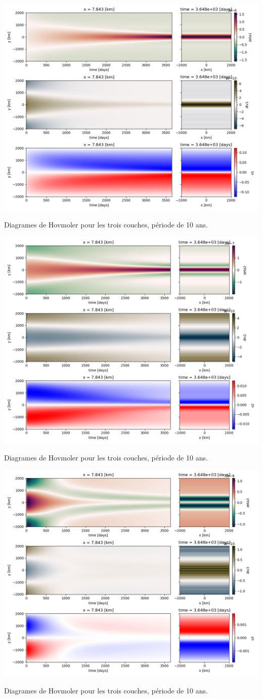\documentclass[10pt]{article}
\numberwithin{equation}{section}
\begin{document}
\begin{center}
\includegraphics[width=.9\linewidth]{figures/tests/test1_2023-03-31.png}
\caption{\label{fig:org6827a3f}Diagrames de Hovmoler pour les trois couches, période de 10 ans.}
\end{center}
\begin{center}
\includegraphics[width=.9\linewidth]{figures/tests/test2_2023-03-31.png}
\caption{\label{fig:org6827a3f}Diagrames de Hovmoler pour les trois couches, période de 10 ans.}
\end{center}
\begin{center}
\includegraphics[width=.9\linewidth]{figures/tests/test3_2023-03-31.png}
\caption{\label{fig:org6827a3f}Diagrames de Hovmoler pour les trois couches, période de 10 ans.}
\end{center}
\end{document}
